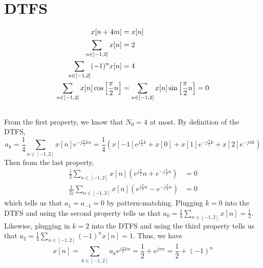 \documentclass{article}
\begin{document}
\section{DTFS}

\begin{align}
    x[n + 4m] &= x[n] \\
    \sum_{n \in [-1, 2]} x[n] &= 2 \\
    \sum_{n \in [-1, 2]} (-1)^n x[n] &= 4 \\
    \sum_{n \in [-1, 2]} x[n] \cos\qty[\frac{\pi}{2} n] &= \sum_{n \in [-1, 2]} x[n] \sin\qty[\frac{\pi}{2} n] = 0
\end{align}

\subsection{}

From the first property, we know that \(N_0 = 4\) at most.
By definition of the DTFS,
\begin{equation}
    a_k = \frac{1}{4} \sum_{n \in [-1, 2]} x[n] e^{-j \frac{\pi}{2} k n} = \frac{1}{4} (x[-1] e^{j \frac{\pi}{2} k} + x[0] + x[1] e^{-j \frac{\pi}{2} k} + x[2] e^{-j \pi k})
\end{equation}
Then from the last property,
\begin{align}
    \frac{1}{2} \sum_{n \in [-1, 2]} x[n] (e^{j \frac{\pi}{2}} n + e^{-j \frac{\pi}{2} n}) &= 0 \\
    \frac{1}{2j} \sum_{n \in [-1, 2]} x[n] (e^{j \frac{\pi}{2} n} - e^{-j \frac{\pi}{2} n}) &= 0
\end{align}
which tells us that \(a_1 = a_{-1} = 0\) by pattern-matching.
Plugging \(k = 0\) into the DTFS and using the second property tells us that \(a_0 = \frac{1}{4} \sum_{n \in [-1, 2]} x[n] = \frac{1}{2}\).
Likewise, plugging in \(k = 2\) into the DTFS and using the third property tells us that \(a_2 = \frac{1}{4} \sum_{n \in [-1, 2]} (-1)^n x[n] = 1\).
Thus, we have
\begin{equation}
    x[n] = \sum_{k \in [-1, 2]} a_k e^{j \frac{\pi}{2} k n} = \frac{1}{2} + e^{j \pi n} = \frac{1}{2} + (-1)^n
\end{equation}
\begin{center}
\end{center}
\end{document}
